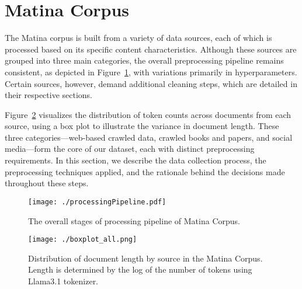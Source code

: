 \section{Matina Corpus}

The Matina corpus is built from a variety of data sources, each of which is processed based on its specific content characteristics. Although these sources are grouped into three main categories, the overall preprocessing pipeline remains consistent, as depicted in Figure~\ref{fig:pipeline}, with variations primarily in hyperparameters. Certain sources, however, demand additional cleaning steps, which are detailed in their respective sections.

Figure~\ref{fig:boxplot1} visualizes the distribution of token counts across documents from each source, using a box plot to illustrate the variance in document length. These three categories—web-based crawled data, crawled books and papers, and social media—form the core of our dataset, each with distinct preprocessing requirements. In this section, we describe the data collection process, the preprocessing techniques applied, and the rationale behind the decisions made throughout these steps.

\begin{figure}[t]
  \texttt{[image: ./processingPipeline.pdf]}
  \caption{The overall stages of processing pipeline of Matina Corpus.}
  \label{fig:pipeline}

\end{figure} 


\begin{figure}[t]
  \texttt{[image: ./boxplot\_all.png]}
  \caption{Distribution of document length by source in the Matina Corpus. Length is determined by the log of the number of tokens using Llama3.1 \cite{dubey2024llama3.1} tokenizer.}
  \label{fig:boxplot1}
\end{figure}


